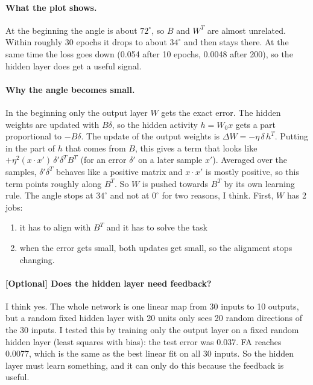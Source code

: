 \documentclass{article}
\begin{document}
\paragraph{What the plot shows.} At the beginning the angle is about $72^\circ$, so $B$ and $W^T$ are almost unrelated. 
Within roughly 30 epochs it drops to about $34^\circ$ and then stays there. At the same time the loss goes down (0.054 after 10 epochs, 0.0048 after 200), so the hidden layer does get a useful signal.

\paragraph{Why the angle becomes small.} In the beginning only the output layer $W$ gets the exact error. 
The hidden weights are updated with $B\delta$, so the hidden activity $h = W_0 x$ gets a part proportional to $-B\delta$. 
The update of the output weights is $\Delta W = -\eta\,\delta\, h^T$. Putting in the part of $h$ that comes from $B$, this gives a term that looks like $+\eta^2 (x\cdot x')\,\delta'\delta^T B^T$ (for an error $\delta'$ on a later sample $x'$). 
Averaged over the samples, $\delta'\delta^T$ behaves like a positive matrix and $x\cdot x'$ is mostly positive, so this term points roughly along $B^T$. 
So $W$ is pushed towards $B^T$ by its own learning rule. The angle stops at $34^\circ$ and not at $0^\circ$ for two reasons, I think. 
First, $W$ has 2 jobs: 
\begin{enumerate}
    \item it has to align with $B^T$ and it has to solve the task
    \item when the error gets small, both updates get small, so the alignment stops changing.
\end{enumerate}

\paragraph{[Optional] Does the hidden layer need feedback?} I think yes. The whole network is one linear map from 30 inputs to 10 outputs, but a random fixed hidden layer with 20 units only sees 20 random directions of the 30 inputs. 
I tested this by training only the output layer on a fixed random hidden layer (least squares with bias): the test error was 0.037. 
FA reaches 0.0077, which is the same as the best linear fit on all 30 inputs. So the hidden layer must learn something, and it can only do this because the feedback is useful.
\end{document}
